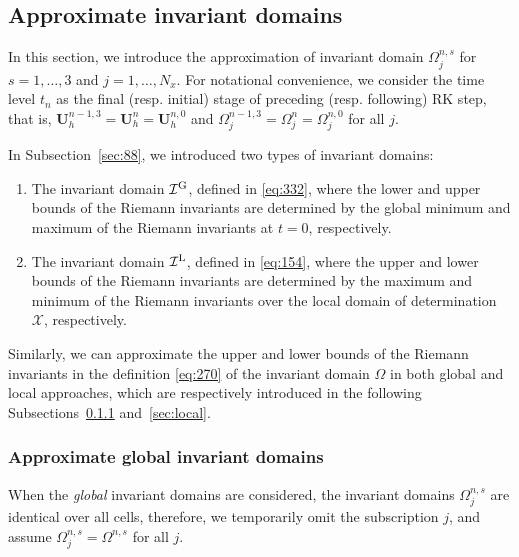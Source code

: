\documentclass[times,final]{elsarticle}
\numberwithin{equation}{section}
\theoremstyle{definition}
\theoremstyle{remark}
\newcommand{\BU}{\mathbf{U}}
\begin{document}
\subsection{Approximate invariant domains}\label{sec:1596}

In this section, we introduce the approximation of invariant domain $\Omega^{n,s}_j$ for $s = 1,\dots,3$ and $j = 1,\dots,N_x$.
For notational convenience, we consider the time level $t_n$ as the final (resp. initial) stage of preceding (resp. following) RK step, that is, $\BU^{n-1,3}_h = \BU^n_h = \BU^{n,0}_h$ and $\Omega_j^{n-1,3} = \Omega_j^n = \Omega_j^{n,0}$ for all $j$.

In Subsection~\ref{sec:88}, we introduced two types of invariant domains:
\begin{enumerate}[leftmargin=8mm]
	\item[(i)] The invariant domain $\mathcal{I}^{\rm G}$, defined in \eqref{eq:332}, where the lower and upper bounds of the Riemann invariants are determined by the global minimum and maximum of the Riemann invariants at $t = 0$, respectively.
	\item[(ii)] The invariant domain $\mathcal{I}^{\rm L}$, defined in \eqref{eq:154}, where the upper and lower bounds of the Riemann invariants are determined by the maximum and minimum of the Riemann invariants over the local domain of determination $\mathcal{X}$, respectively.
\end{enumerate}
Similarly, we can approximate the upper and lower bounds of the Riemann invariants in the definition \eqref{eq:270} of the invariant domain $\Omega$ in both global and local approaches, which are respectively introduced in the following Subsections~\ref{sec:global} and~\ref{sec:local}.

\subsubsection{Approximate global invariant domains}\label{sec:global}

When the {\em global} invariant domains are considered, the invariant domains $\Omega^{n,s}_j$ are identical over all cells, therefore, we temporarily omit the subscription $j$, and assume $\Omega^{n,s}_j = \Omega^{n,s}$ for all $j$.
\end{document}
